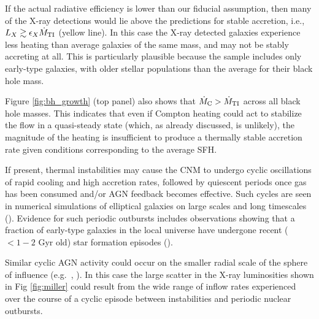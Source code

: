 \documentclass[usenatbib,fleqn]{mn2e}
\begin{document}
If the actual radiative efficiency is lower than our
fiducial assumption, then many of the X-ray detections would lie above
the predictions for stable accretion, i.e., $L_X \gtrsim \epsilon_X \dot{M}_{\rm TI}$ (yellow line).  In this case the X-ray detected galaxies experience
less heating than average galaxies of the same mass, and may not be
stably accreting at all.  This is particularly plausible because the
\citet{Miller+15} sample includes only early-type galaxies, with older
stellar populations than the average for their black hole mass.

Figure \ref{fig:bh_growth} (top panel) also shows that $\dot{M}_{\rm
  C} > \dot{M}_{\rm TI}$ across all black hole masses.  This indicates
that even if Compton heating could act to stabilize the flow in a
quasi-steady state (which, as already discussed, is unlikely), the
magnitude of the heating is insufficient to produce a thermally stable
accretion rate given conditions corresponding to the average SFH.

If present, thermal instabilities may cause the CNM to undergo cyclic
oscillations of rapid cooling and high accretion rates, followed by
quiescent periods once gas has been consumed and/or AGN feedback
becomes effective.  Such cycles are seen in numerical simulations of
elliptical galaxies on large scales and long timescales
(\citealt{Ciotti+10}).  Evidence for such periodic outbursts includes
observations showing that a fraction of early-type galaxies in the
local universe have undergone recent ($< 1-2$ Gyr old) star formation
episodes (\citealt{Donas+07}).

Similar cyclic AGN activity could occur on the smaller radial scale of
the sphere of influence (e.g.~\citealt{Yuan&Li11},
\citealt{Cuadra+15}).  In this case the large scatter in the X-ray
luminosities shown in Fig \ref{fig:miller} could result from the wide
range of inflow rates experienced over the course of a cyclic episode
between instabilities and periodic nuclear outbursts. 


\end{document}
